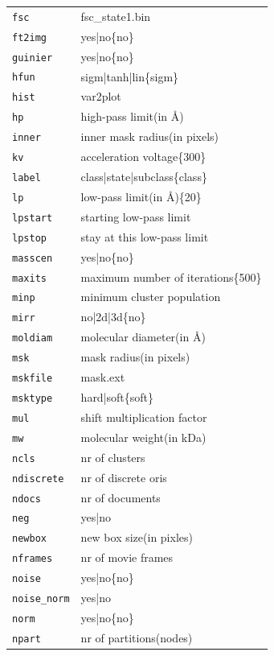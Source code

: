 \documentclass[a4paper,11pt]{article}
\begin{document}
\begin{tabular}{ll}
\texttt{fsc}&{fsc\_state1.bin}\\
\texttt{ft2img}&{yes|no\{no\}}\\
\texttt{guinier}&{yes|no\{no\}}\\
\texttt{hfun}&{sigm|tanh|lin\{sigm\}}\\
\texttt{hist}&{var2plot}\\
\texttt{hp}&{high-pass limit(in \AA{})}\\
\texttt{inner}&{inner mask radius(in pixels)}\\
\texttt{kv}&{acceleration voltage\{300\}}\\
\texttt{label}&{class|state|subclass\{class\}}\\
\texttt{lp}&{low-pass limit(in \AA{})\{20\}}\\
\texttt{lpstart}&{starting low-pass limit}\\
\texttt{lpstop}&{stay at this low-pass limit}\\
\texttt{masscen}&{yes|no\{no\}}\\
\texttt{maxits}&{maximum number of iterations\{500\}}\\
\texttt{minp}&{minimum cluster population}\\
\texttt{mirr}&{no|2d|3d\{no\}}\\
\texttt{moldiam}&{molecular diameter(in \AA{})}\\
\texttt{msk}&{mask radius(in pixels)}\\
\texttt{mskfile}&{mask.ext}\\
\texttt{msktype}&{hard|soft\{soft\}}\\
\texttt{mul}&{shift multiplication factor}\\
\texttt{mw}&{molecular weight(in kDa)}\\
\texttt{ncls}&{nr of clusters}\\
\texttt{ndiscrete}&{nr of discrete oris}\\
\texttt{ndocs}&{nr of documents}\\
\texttt{neg}&{yes|no}\\
\texttt{newbox}&{new box size(in pixles)}\\
\texttt{nframes}&{nr of movie frames }\\
\texttt{noise}&{yes|no\{no\}}\\
\texttt{noise\_norm}&{yes|no}\\
\texttt{norm}&{yes|no\{no\}}\\
\texttt{npart}&{nr of partitions(nodes)}\\

\end{tabular}
\end{document}
